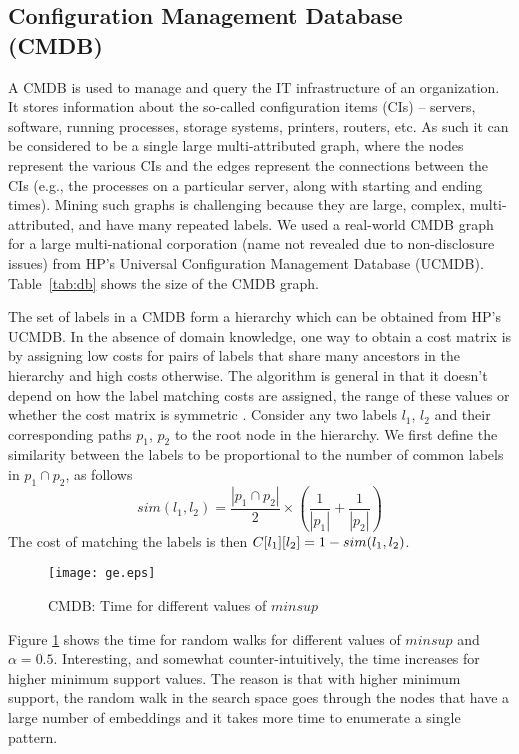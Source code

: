\subsection{Configuration Management Database\\ (CMDB)} 

A CMDB is used to manage and query the IT infrastructure of an
organization. It stores information about the so-called configuration
items (CIs) -- servers, software, running processes, storage systems,
printers, routers, etc. As such it can be considered to be a single
large multi-attributed graph, where the nodes represent the various CIs
and the edges represent the connections between the CIs (e.g., the
processes on a particular server, along with starting and ending times).
Mining such graphs is challenging because they are large, complex,
multi-attributed, and have many repeated labels.  We used a real-world
CMDB graph for a large multi-national corporation (name not revealed due
to non-disclosure issues) from HP's Universal Configuration Management
Database (UCMDB).  Table~\ref{tab:db} shows the size of the CMDB graph. 


\smallskip{} 
The set of labels in a CMDB form a
hierarchy which can be obtained from HP's UCMDB. In the absence of
domain knowledge, one way to obtain a cost matrix is by assigning low
costs for pairs of labels that share many ancestors in the hierarchy and
high costs otherwise. The algorithm is general in that it doesn't depend
on how the label matching costs are assigned, the range of these
values or whether the cost matrix is symmetric
.  Consider any two labels $l_1$, $l_2$ and their corresponding
paths $p_1$, $p_2$ to the root node in the hierarchy.  We first define
the similarity between the labels to be proportional to the number of
common labels in $p_1 \cap p_2$, as follows
\begin{equation*}
  sim(l_1,l_2) =  \frac{|p_1 \cap p_2|}{2} \times 
  \left(\frac{1}{|p_1|} + \frac{1}{|p_2|}\right)
\end{equation*}
The cost of matching the labels is then 
${C}[l_1][l_2] = 1 - sim(l_1,l_2)$.

\begin{figure}[!ht]
  \centerline{
    \texttt{[image: ge.eps]}
	}
    \caption{CMDB: Time for different values of
	$minsup$}
    \label{fig:ge}
\end{figure}


\smallskip{} Figure \ref{fig:ge} shows the
time for random walks for different values of $minsup$ and $\alpha =
0.5$. Interesting, and somewhat counter-intuitively, the time increases
for higher minimum support values.  The reason is that with higher
minimum support, the random walk in the search space goes through the
nodes that have a large number of embeddings and it takes more time to
enumerate a single pattern.

